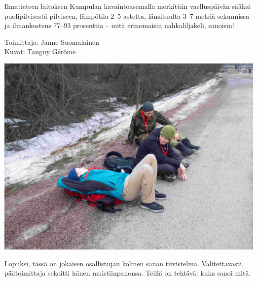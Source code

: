 \documentclass[10pt,finnish,a5paper,headings=small,twoside=semi]{scrartcl}
\begin{document}
\begin{multicols}{2}
	Ilmatieteen laitoksen Kumpulan havaintoasemalla merkittiin
	vaelluspäivän sääksi puolipilvisestä pilviseen, lämpötila 2–5 astetta,
	länsituulta 3–7 metriä sekunnissa ja ilmankosteus 77–93 prosenttia –
	mitä erinomaisin nahkaliljakeli, sanoisin!\\

	\vspace*{0.50cm}

	\raggedleft Toimittaja: Janne Suomalainen\\
	\vspace*{0.10cm}
	\raggedleft Kuvat: Tanguy Gérôme

\end{multicols}

\begin{center}
\includegraphics[width=0.65\linewidth]{assets/nahkaliljaviikki}
\end{center}

Lopuksi, tässä on jokaisen osallistujan kolmen sanan tiivistelmä.
Valitettavasti, päätoimittaja sekoitti hänen muistiinpanonsa.
Teillä on tehtävä: kuka sanoi mitä.
\end{document}
